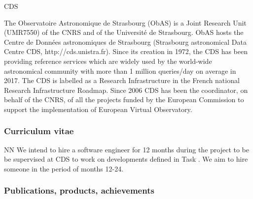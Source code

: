 \begin{sitedescription}{CDS}

The Observatoire Astronomique de Strasbourg (ObAS) is a Joint Research Unit
(UMR7550) of the CNRS and of the Université de Strasbourg. ObAS hosts the 
Centre de Données astronomiques de Strasbourg (Strasbourg astronomical Data 
Centre CDS, http://cds.unistra.fr). Since its creation in 1972, the CDS has 
been providing reference services which are widely used by the world-wide 
astronomical community with more than 1 million queries/day on average in 
2017. The CDS is labelled as a Research Infrastructure in the French national
Research Infrastructure Roadmap. Since 2006 CDS has been the coordinator,
on behalf of the CNRS, of all the projects funded by the European Commission
to support the implementation of European Virtual Observatory. 

%

\subsubsection*{Curriculum vitae}


%
%





\begin{participant}[type=res,PM=12,salary=4200]{NN}
    We intend to hire a software engineer for 12 months during the project to be be supervised at CDS to work on developments defined in Task . We aim to hire someone in the period of months 12-24. 
\end{participant}


\subsubsection*{Publications, products, achievements}


\end{sitedescription}
